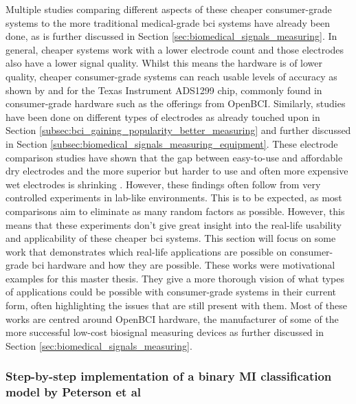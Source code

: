 Multiple studies comparing different aspects of these cheaper consumer-grade systems to the more traditional medical-grade \gls{bci} systems have already been done, as is further discussed in Section \ref{sec:biomedical_signals_measuring}.
In general, cheaper systems work with a lower electrode count and those electrodes also have a lower signal quality.
Whilst this means the hardware is of lower quality, cheaper consumer-grade systems can reach usable levels of accuracy as shown by \citet{openbci_vs_medical} and \citet{openbci_eeg_sensor_evaluation} for the Texas Instrument ADS1299 chip, commonly found in consumer-grade hardware such as the offerings from OpenBCI.
Similarly, studies have been done on different types of electrodes as already touched upon in Section \ref{subsec:bci_gaining_popularity_better_measuring} and further discussed in Section \ref{subsec:biomedical_signals_measuring_equipment}.
These electrode comparison studies have shown that the gap between easy-to-use and affordable dry electrodes and the more superior but harder to use and often more expensive wet electrodes is shrinking \citep{wet_vs_dry, dry_electrode_status, wet_dry_comparison_experiment}.
However, these findings often follow from very controlled experiments in lab-like environments.
This is to be expected, as most comparisons aim to eliminate as many random factors as possible.
However, this means that these experiments don't give great insight into the real-life usability and applicability of these cheaper \gls{bci} systems.
This section will focus on some work that demonstrates which real-life applications are possible on consumer-grade \gls{bci} hardware and how they are possible.
These works were motivational examples for this master thesis.
They give a more thorough vision of what types of applications could be possible with consumer-grade systems in their current form, often highlighting the issues that are still present with them.
Most of these works are centred around OpenBCI hardware, the manufacturer of some of the more successful low-cost \gls{biosignal} measuring devices as further discussed in Section \ref{sec:biomedical_signals_measuring}.


\subsubsection{Step-by-step implementation of a binary MI classification model by Peterson et al}
\label{subsubsec:bci_opportunities_obstacles_motivating_examples_binary}

